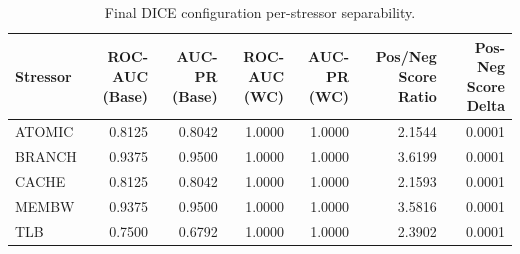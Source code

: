 \begin{table}[t]
\centering
\caption{Final DICE configuration per-stressor separability.}
\label{tab:dice_full_stressor}
\footnotesize
\begin{tabular}{lrrrrrr}
\toprule
Stressor & ROC-AUC (Base) & AUC-PR (Base) & ROC-AUC (WC) & AUC-PR (WC) & Pos/Neg Score Ratio & Pos-Neg Score Delta \\
\midrule
ATOMIC & 0.8125 & 0.8042 & 1.0000 & 1.0000 & 2.1544 & 0.0001 \\
BRANCH & 0.9375 & 0.9500 & 1.0000 & 1.0000 & 3.6199 & 0.0001 \\
CACHE & 0.8125 & 0.8042 & 1.0000 & 1.0000 & 2.1593 & 0.0001 \\
MEMBW & 0.9375 & 0.9500 & 1.0000 & 1.0000 & 3.5816 & 0.0001 \\
TLB & 0.7500 & 0.6792 & 1.0000 & 1.0000 & 2.3902 & 0.0001 \\
\bottomrule
\end{tabular}

\end{table}
